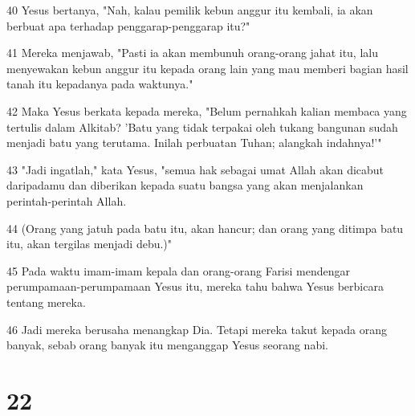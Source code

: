 \par 40 Yesus bertanya, "Nah, kalau pemilik kebun anggur itu kembali, ia akan berbuat apa terhadap penggarap-penggarap itu?"
\par 41 Mereka menjawab, "Pasti ia akan membunuh orang-orang jahat itu, lalu menyewakan kebun anggur itu kepada orang lain yang mau memberi bagian hasil tanah itu kepadanya pada waktunya."
\par 42 Maka Yesus berkata kepada mereka, "Belum pernahkah kalian membaca yang tertulis dalam Alkitab? 'Batu yang tidak terpakai oleh tukang bangunan sudah menjadi batu yang terutama. Inilah perbuatan Tuhan; alangkah indahnya!'"
\par 43 "Jadi ingatlah," kata Yesus, "semua hak sebagai umat Allah akan dicabut daripadamu dan diberikan kepada suatu bangsa yang akan menjalankan perintah-perintah Allah.
\par 44 (Orang yang jatuh pada batu itu, akan hancur; dan orang yang ditimpa batu itu, akan tergilas menjadi debu.)"
\par 45 Pada waktu imam-imam kepala dan orang-orang Farisi mendengar perumpamaan-perumpamaan Yesus itu, mereka tahu bahwa Yesus berbicara tentang mereka.
\par 46 Jadi mereka berusaha menangkap Dia. Tetapi mereka takut kepada orang banyak, sebab orang banyak itu menganggap Yesus seorang nabi.

\chapter{22}

